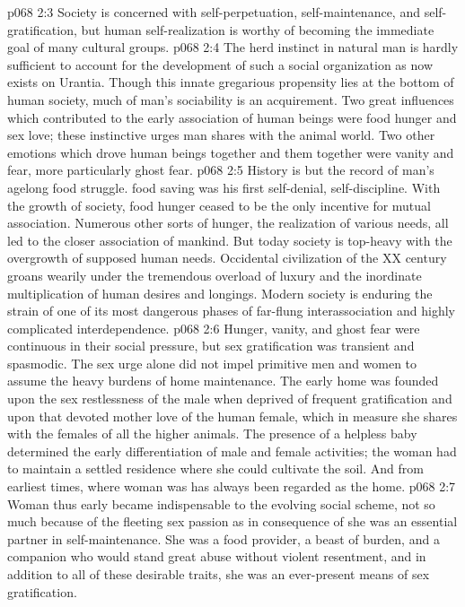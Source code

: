 \vs p068 2:3 Society is concerned with self\hyp{}perpetuation, self\hyp{}maintenance, and self\hyp{}gratification, but human self\hyp{}realization is worthy of becoming the immediate goal of many cultural groups.
\vs p068 2:4 The herd instinct in natural man is hardly sufficient to account for the development of such a social organization as now exists on Urantia. Though this innate gregarious propensity lies at the bottom of human society, much of man’s sociability is an acquirement. Two great influences which contributed to the early association of human beings were food hunger and sex love; these instinctive urges man shares with the animal world. Two other emotions which drove human beings together and  them together were vanity and fear, more particularly ghost fear.
\vs p068 2:5 \pc History is but the record of man’s agelong food struggle.  food saving was his first self\hyp{}denial, self\hyp{}discipline. With the growth of society, food hunger ceased to be the only incentive for mutual association. Numerous other sorts of hunger, the realization of various needs, all led to the closer association of mankind. But today society is top\hyp{}heavy with the overgrowth of supposed human needs. Occidental civilization of the XX century groans wearily under the tremendous overload of luxury and the inordinate multiplication of human desires and longings. Modern society is enduring the strain of one of its most dangerous phases of far\hyp{}flung interassociation and highly complicated interdependence.
\vs p068 2:6 Hunger, vanity, and ghost fear were continuous in their social pressure, but sex gratification was transient and spasmodic. The sex urge alone did not impel primitive men and women to assume the heavy burdens of home maintenance. The early home was founded upon the sex restlessness of the male when deprived of frequent gratification and upon that devoted mother love of the human female, which in measure she shares with the females of all the higher animals. The presence of a helpless baby determined the early differentiation of male and female activities; the woman had to maintain a settled residence where she could cultivate the soil. And from earliest times, where woman was has always been regarded as the home.
\vs p068 2:7 Woman thus early became indispensable to the evolving social scheme, not so much because of the fleeting sex passion as in consequence of  she was an essential partner in self\hyp{}maintenance. She was a food provider, a beast of burden, and a companion who would stand great abuse without violent resentment, and in addition to all of these desirable traits, she was an ever\hyp{}present means of sex gratification.

